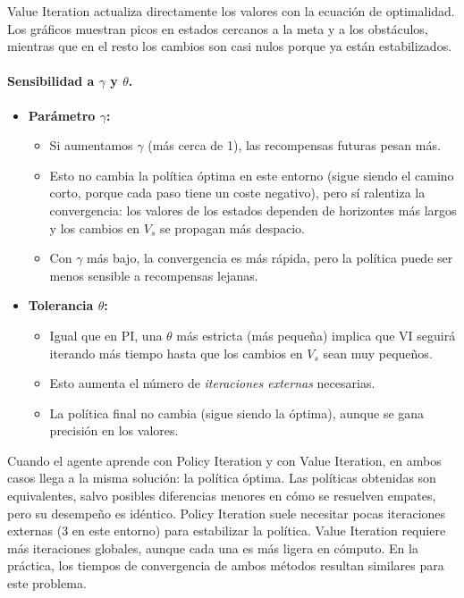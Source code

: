 \documentclass[a4paper,12pt]{article}
\begin{document}
Value Iteration actualiza directamente los valores con la ecuación de optimalidad.  
Los gráficos muestran picos en estados cercanos a la meta y a los obstáculos, mientras que en el resto los cambios son casi nulos porque ya están estabilizados.

\paragraph{Sensibilidad a $\gamma$ y $\theta$.}
\begin{itemize}
    \item \textbf{Parámetro $\gamma$:}
    \begin{itemize}
        \item Si aumentamos $\gamma$ (más cerca de 1), las recompensas futuras pesan más.
        \item Esto no cambia la política óptima en este entorno (sigue siendo el camino corto, porque cada paso tiene un coste negativo), pero sí ralentiza la convergencia: los valores de los estados dependen de horizontes más largos y los cambios en $V_s$ se propagan más despacio.
        \item Con $\gamma$ más bajo, la convergencia es más rápida, pero la política puede ser menos sensible a recompensas lejanas.
    \end{itemize}
    \item \textbf{Tolerancia $\theta$:}
    \begin{itemize}
        \item Igual que en PI, una $\theta$ más estricta (más pequeña) implica que VI seguirá iterando más tiempo hasta que los cambios en $V_s$ sean muy pequeños.
        \item Esto aumenta el número de \emph{iteraciones externas} necesarias.
        \item La política final no cambia (sigue siendo la óptima), aunque se gana precisión en los valores.
    \end{itemize}
\end{itemize}

Cuando el agente aprende con Policy Iteration y con Value Iteration, en ambos casos llega a la misma solución: la política óptima.
Las políticas obtenidas son equivalentes, salvo posibles diferencias menores en cómo se resuelven empates, pero su desempeño es idéntico.
Policy Iteration suele necesitar pocas iteraciones externas (3 en este entorno) para estabilizar la política.
Value Iteration requiere más iteraciones globales, aunque cada una es más ligera en cómputo.
En la práctica, los tiempos de convergencia de ambos métodos resultan similares para este problema.
\end{document}
